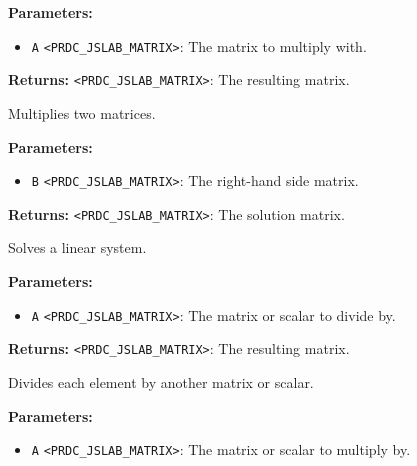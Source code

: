 \documentclass[12pt,a4paper]{article}
\begin{document}
\noindent \textbf{Parameters:}
\begin{itemize}
  \item \texttt{A} \texttt{<PRDC\_JSLAB\_MATRIX>}: The matrix to multiply with.
\end{itemize}

\noindent \textbf{Returns:} \texttt{<PRDC\_JSLAB\_MATRIX>}: The resulting matrix.

\noindent Multiplies two matrices.

\vspace{5mm}
\noindent {}


\noindent \textbf{Parameters:}
\begin{itemize}
  \item \texttt{B} \texttt{<PRDC\_JSLAB\_MATRIX>}: The right-hand side matrix.
\end{itemize}

\noindent \textbf{Returns:} \texttt{<PRDC\_JSLAB\_MATRIX>}: The solution matrix.

\noindent Solves a linear system.

\vspace{5mm}
\noindent {}


\noindent \textbf{Parameters:}
\begin{itemize}
  \item \texttt{A} \texttt{<PRDC\_JSLAB\_MATRIX>}: The matrix or scalar to divide by.
\end{itemize}

\noindent \textbf{Returns:} \texttt{<PRDC\_JSLAB\_MATRIX>}: The resulting matrix.

\noindent Divides each element by another matrix or scalar.

\vspace{5mm}
\noindent {}


\noindent \textbf{Parameters:}
\begin{itemize}
  \item \texttt{A} \texttt{<PRDC\_JSLAB\_MATRIX>}: The matrix or scalar to multiply by.
\end{itemize}
\end{document}
